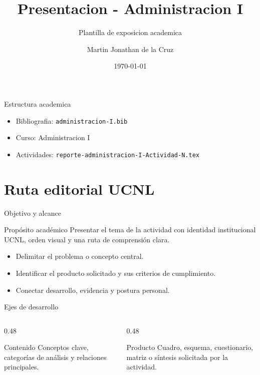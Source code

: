 ﻿\documentclass[spanish,aspectratio=169]{beamer}
\title{Presentacion - Administracion I}
\subtitle{Plantilla de exposicion academica}
\author{Martin Jonathan de la Cruz}
\institute{Universidad Ciudadana de Nuevo Leon}
\date{\today}
\begin{document}
\begin{frame}
  \titlepage
\end{frame}

\begin{frame}{Estructura academica}
  \begin{itemize}
    \item Bibliografia: \texttt{administracion-I.bib}
    \item Curso: Administracion I
    \item Actividades: \texttt{reporte-administracion-I-Actividad-N.tex}
  \end{itemize}
\end{frame}


\section{Ruta editorial UCNL}

\begin{frame}{Objetivo y alcance}
  \begin{block}{Propósito académico}
    Presentar el tema de la actividad con identidad institucional UCNL, orden visual y una ruta de comprensión clara.
  \end{block}
  \begin{itemize}
    \item Delimitar el problema o concepto central.
    \item Identificar el producto solicitado y sus criterios de cumplimiento.
    \item Conectar desarrollo, evidencia y postura personal.
  \end{itemize}
\end{frame}

\begin{frame}{Ejes de desarrollo}
  \begin{columns}[T,totalwidth=\textwidth]
    \begin{column}{0.48\textwidth}
      \begin{block}{Contenido}
        Conceptos clave, categorías de análisis y relaciones principales.
      \end{block}
    \end{column}
    \begin{column}{0.48\textwidth}
      \begin{block}{Producto}
        Cuadro, esquema, cuestionario, matriz o síntesis solicitada por la actividad.
      \end{block}
    \end{column}
  \end{columns}
\end{frame}
\end{document}
